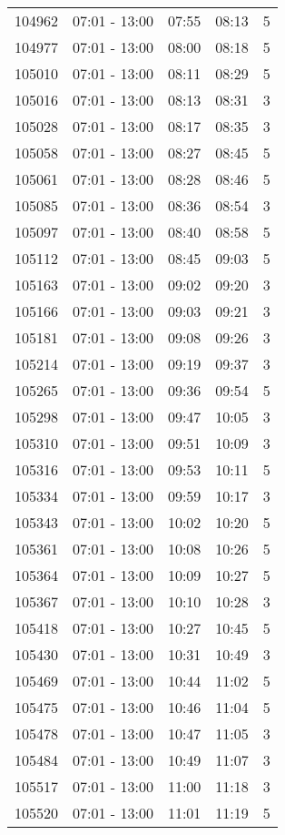\documentclass{article}
\begin{document}
\begin{tabular}{llccc}
104962 & 07:01 - 13:00 & 07:55 & 08:13 & 5 \\
104977 & 07:01 - 13:00 & 08:00 & 08:18 & 5 \\
105010 & 07:01 - 13:00 & 08:11 & 08:29 & 5 \\
105016 & 07:01 - 13:00 & 08:13 & 08:31 & 3 \\
105028 & 07:01 - 13:00 & 08:17 & 08:35 & 3 \\
105058 & 07:01 - 13:00 & 08:27 & 08:45 & 5 \\
105061 & 07:01 - 13:00 & 08:28 & 08:46 & 5 \\
105085 & 07:01 - 13:00 & 08:36 & 08:54 & 3 \\
105097 & 07:01 - 13:00 & 08:40 & 08:58 & 5 \\
105112 & 07:01 - 13:00 & 08:45 & 09:03 & 5 \\
105163 & 07:01 - 13:00 & 09:02 & 09:20 & 3 \\
105166 & 07:01 - 13:00 & 09:03 & 09:21 & 3 \\
105181 & 07:01 - 13:00 & 09:08 & 09:26 & 3 \\
105214 & 07:01 - 13:00 & 09:19 & 09:37 & 3 \\
105265 & 07:01 - 13:00 & 09:36 & 09:54 & 5 \\
105298 & 07:01 - 13:00 & 09:47 & 10:05 & 3 \\
105310 & 07:01 - 13:00 & 09:51 & 10:09 & 3 \\
105316 & 07:01 - 13:00 & 09:53 & 10:11 & 5 \\
105334 & 07:01 - 13:00 & 09:59 & 10:17 & 3 \\
105343 & 07:01 - 13:00 & 10:02 & 10:20 & 5 \\
105361 & 07:01 - 13:00 & 10:08 & 10:26 & 5 \\
105364 & 07:01 - 13:00 & 10:09 & 10:27 & 5 \\
105367 & 07:01 - 13:00 & 10:10 & 10:28 & 3 \\
105418 & 07:01 - 13:00 & 10:27 & 10:45 & 5 \\
105430 & 07:01 - 13:00 & 10:31 & 10:49 & 3 \\
105469 & 07:01 - 13:00 & 10:44 & 11:02 & 5 \\
105475 & 07:01 - 13:00 & 10:46 & 11:04 & 5 \\
105478 & 07:01 - 13:00 & 10:47 & 11:05 & 3 \\
105484 & 07:01 - 13:00 & 10:49 & 11:07 & 3 \\
105517 & 07:01 - 13:00 & 11:00 & 11:18 & 3 \\
105520 & 07:01 - 13:00 & 11:01 & 11:19 & 5 \\

\end{tabular}
\end{document}
